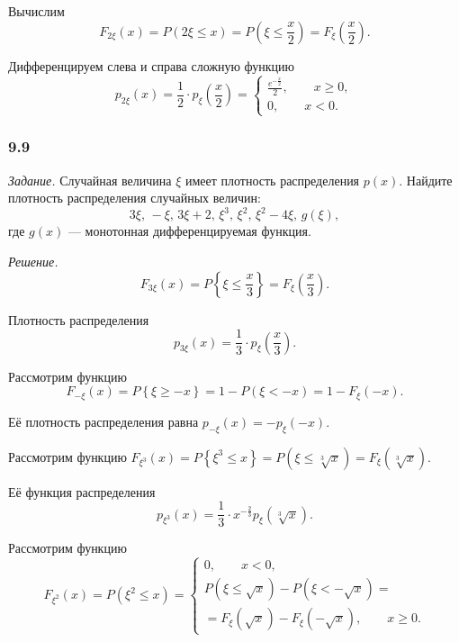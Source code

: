 Вычислим
$$F_{2 \xi } \left( x \right) =
P \left( 2 \xi \leq x \right) =
P \left( \xi \leq \frac{x}{2} \right) =
F_{ \xi } \left( \frac{x}{2} \right).$$

Дифференцируем слева и справа сложную функцию
$$p_{2 \xi} \left( x \right) =
\frac{1}{2} \cdot p_{ \xi } \left( \frac{x}{2} \right) =
\begin{cases}
\frac{e^{- \frac{x}{2}}}{2}, \qquad x \geq 0, \\
0, \qquad x < 0.
\end{cases}$$

\subsubsection*{9.9}

\textit{Задание.} Случайная величина $ \xi $ имеет плотность распределения $p \left( x \right) $.
Найдите плотность распределения случайных величин:
$$3 \xi, \, - \xi, \, 3 \xi + 2, \, \xi^3, \, \xi^2, \, \xi^2 - 4 \xi, \, g \left( \xi \right),$$
где $g \left( x \right) $ --- монотонная дифференцируемая функция. 

\textit{Решение.}
$$F_{3 \xi } \left( x \right) =
P \left\{ \xi \leq \frac{x}{3} \right\} =
F_{ \xi } \left( \frac{x}{3} \right).$$

Плотность распределения
$$p_{3 \xi} \left( x \right) =
\frac{1}{3} \cdot p_{ \xi } \left( \frac{x}{3} \right).$$

Рассмотрим функцию
$$F_{- \xi } \left( x \right) =
P \left\{ \xi \geq - x \right\} =
1 - P \left( \xi < - x \right) =
1 - F_{ \xi } \left( -x \right).$$

Её плотность распределения равна $p_{- \xi } \left( x \right) = - p_{ \xi } \left( -x \right) $.

Рассмотрим функцию $F_{ \xi^3} \left( x \right) = P \left\{ \xi^3 \leq x \right\} = P \left( \xi \leq \sqrt[3]{x} \right) = F_{ \xi } \left( \sqrt[3]{x} \right) $.

Её функция распределения
$$p_{ \xi^3} \left( x \right) =
\frac{1}{3} \cdot x^{- \frac{2}{3}} p_{ \xi } \left( \sqrt[3]{x} \right).$$

Рассмотрим функцию
$$F_{ \xi^2} \left( x \right) =
P \left( \xi^2 \leq x \right) =
\begin{cases}
0, \qquad x < 0, \\
P \left( \xi \leq \sqrt{x} \right) - P \left( \xi < - \sqrt{x} \right) = \\
= F_{ \xi } \left( \sqrt{x} \right) - F_{ \xi } \left( - \sqrt{x} \right), \qquad x \geq 0.
\end{cases}$$

